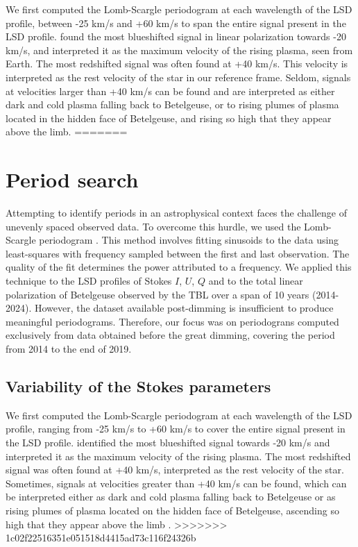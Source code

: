 \documentclass{aa}
\begin{document}
We first computed the Lomb-Scargle periodogram at each wavelength of the LSD profile, between -25 km/s and +60 km/s to span the entire 
signal present in the LSD profile. \cite{lopez_ariste_convective_2018} found the most blueshifted signal in linear polarization  towards -20 km/s, 
and interpreted it as  the maximum velocity of the rising plasma, seen from  Earth. The most redshifted signal was often found at +40 km/s. 
This velocity is interpreted
as the rest velocity of the star in our reference frame. Seldom, signals at velocities larger than +40 km/s can be found 
and are interpreted as either dark and cold plasma falling back to Betelgeuse, 
or to rising plumes of plasma located in the hidden face of Betelgeuse,
and rising so high that they appear above the limb.
=======
\section{Period search}
\label{section 3}


Attempting to identify periods in an astrophysical context faces the challenge of unevenly spaced observed data. To overcome this hurdle, 
we used the Lomb-Scargle periodogram \citep{lomb_least-squares_1976,scargle_studies_1982}. This method involves fitting sinusoids to the data using least-squares with frequency sampled between the first and last observation. The quality of the fit determines the power attributed to a frequency. We applied this technique to the  LSD profiles of Stokes $I$, $U$, $Q$ and to the total linear polarization of Betelgeuse observed by the TBL over a span of 10 years (2014-2024). However, the dataset available post-dimming is insufficient to produce meaningful periodograms. Therefore, our focus was on periodograns computed exclusively from data obtained before the great dimming, covering the period from 2014 to the end of 2019. 

\subsection{Variability of the Stokes parameters}

We first computed the Lomb-Scargle periodogram at each wavelength of the LSD profile, ranging from -25 km/s to +60 km/s to cover the entire 
signal present in the LSD profile. \cite{lopez_ariste_convective_2018} identified the most blueshifted signal towards -20 km/s and interpreted it as  the maximum velocity of the rising plasma. The most redshifted signal was often found at +40 km/s, interpreted 
as the rest velocity of the star. Sometimes, signals at velocities greater than +40 km/s can be found, which can be interpreted either as dark and cold plasma falling back to Betelgeuse or as rising plumes of plasma located on the hidden face of Betelgeuse, ascending so high that they appear above the limb \citep[for the case of the RSG $\mu$Cep]{lopez_ariste_height_2023}.
>>>>>>> 1c02f22516351e051518d4415ad73c116f24326b
\end{document}
